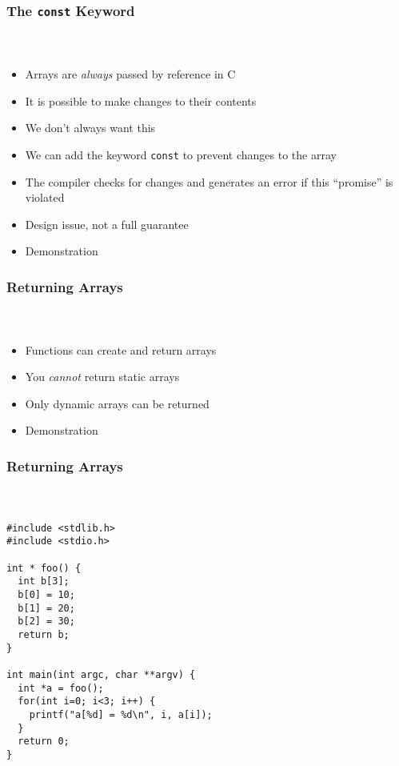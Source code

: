 \documentclass[]{beamer}
\begin{document}
\begin{frame}[fragile]
    \frametitle{The \texttt{const} Keyword}
    \framesubtitle{~}
    

\begin{itemize}[<+->]
  \item Arrays are \emph{always} passed by reference in C
  \item It is possible to make changes to their contents
  \item We don't always want this
  \item We can add the keyword \texttt{const} to prevent changes to the array
  \item The compiler checks for changes and generates an error if this ``promise'' is violated
  \item Design issue, not a full guarantee
  \item Demonstration
\end{itemize}
  
\end{frame}

\begin{frame}[fragile]
    \frametitle{Returning Arrays}
    \framesubtitle{~}
    
\begin{itemize}[<+->]  
  \item Functions can create and return arrays
  \item You \emph{cannot} return static arrays
  \item Only dynamic arrays can be returned
  \item Demonstration
\end{itemize}
  
\end{frame}

\begin{frame}[fragile]
    \frametitle{Returning Arrays}
    \framesubtitle{~}
    
\begin{verbatim}
#include <stdlib.h> 
#include <stdio.h>

int * foo() {
  int b[3];
  b[0] = 10;
  b[1] = 20;
  b[2] = 30;
  return b; 
}

int main(int argc, char **argv) {
  int *a = foo();
  for(int i=0; i<3; i++) {
    printf("a[%d] = %d\n", i, a[i]);
  }
  return 0; 
}
\end{verbatim}  

\end{frame}
\end{document}
